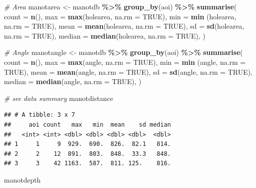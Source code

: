 \documentclass[
]{article}
\newenvironment{Shaded}{\begin{snugshade}}{\end{snugshade}}
\newcommand{\AttributeTok}[1]{\textcolor[rgb]{0.13,0.29,0.53}{#1}}
\newcommand{\CommentTok}[1]{\textcolor[rgb]{0.56,0.35,0.01}{\textit{#1}}}
\newcommand{\ConstantTok}[1]{\textcolor[rgb]{0.56,0.35,0.01}{#1}}
\newcommand{\FunctionTok}[1]{\textcolor[rgb]{0.13,0.29,0.53}{\textbf{#1}}}
\newcommand{\NormalTok}[1]{#1}
\newcommand{\OtherTok}[1]{\textcolor[rgb]{0.56,0.35,0.01}{#1}}
\newcommand{\SpecialCharTok}[1]{\textcolor[rgb]{0.81,0.36,0.00}{\textbf{#1}}}
\begin{document}
\begin{Shaded}
\begin{Highlighting}[]
\CommentTok{\# Area}
\NormalTok{manotarea }\OtherTok{\textless{}{-}}\NormalTok{ manotdb }\SpecialCharTok{\%\textgreater{}\%} \FunctionTok{group\_by}\NormalTok{(aoi) }\SpecialCharTok{\%\textgreater{}\%}
      \FunctionTok{summarise}\NormalTok{(}
      \AttributeTok{count =} \FunctionTok{n}\NormalTok{(),}
      \AttributeTok{max =} \FunctionTok{max}\NormalTok{(holearea, }\AttributeTok{na.rm =} \ConstantTok{TRUE}\NormalTok{),}
      \AttributeTok{min =} \FunctionTok{min}\NormalTok{ (holearea, }\AttributeTok{na.rm =} \ConstantTok{TRUE}\NormalTok{),}
      \AttributeTok{mean =} \FunctionTok{mean}\NormalTok{(holearea, }\AttributeTok{na.rm =} \ConstantTok{TRUE}\NormalTok{),}
      \AttributeTok{sd =} \FunctionTok{sd}\NormalTok{(holearea, }\AttributeTok{na.rm =} \ConstantTok{TRUE}\NormalTok{),}
      \AttributeTok{median =} \FunctionTok{median}\NormalTok{(holearea, }\AttributeTok{na.rm =} \ConstantTok{TRUE}\NormalTok{),}
\NormalTok{  ) }

\CommentTok{\# Angle}
\NormalTok{manotangle }\OtherTok{\textless{}{-}}\NormalTok{ manotdb }\SpecialCharTok{\%\textgreater{}\%} \FunctionTok{group\_by}\NormalTok{(aoi) }\SpecialCharTok{\%\textgreater{}\%}
      \FunctionTok{summarise}\NormalTok{(}
      \AttributeTok{count =} \FunctionTok{n}\NormalTok{(),}
      \AttributeTok{max =} \FunctionTok{max}\NormalTok{(angle, }\AttributeTok{na.rm =} \ConstantTok{TRUE}\NormalTok{),}
      \AttributeTok{min =} \FunctionTok{min}\NormalTok{ (angle, }\AttributeTok{na.rm =} \ConstantTok{TRUE}\NormalTok{),}
      \AttributeTok{mean =} \FunctionTok{mean}\NormalTok{(angle, }\AttributeTok{na.rm =} \ConstantTok{TRUE}\NormalTok{),}
      \AttributeTok{sd =} \FunctionTok{sd}\NormalTok{(angle, }\AttributeTok{na.rm =} \ConstantTok{TRUE}\NormalTok{),}
      \AttributeTok{median =} \FunctionTok{median}\NormalTok{(angle, }\AttributeTok{na.rm =} \ConstantTok{TRUE}\NormalTok{),}
\NormalTok{  ) }

\CommentTok{\# see data summary}
\NormalTok{manotdistance}
\end{Highlighting}
\end{Shaded}

\begin{verbatim}
## # A tibble: 3 x 7
##     aoi count   max   min  mean    sd median
##   <int> <int> <dbl> <dbl> <dbl> <dbl>  <dbl>
## 1     1     9  929.  690.  826.  82.1   814.
## 2     2    12  891.  803.  848.  33.3   848.
## 3     3    42 1163.  587.  811. 125.    816.
\end{verbatim}

\begin{Shaded}
\begin{Highlighting}[]
\NormalTok{manotdepth}
\end{Highlighting}
\end{Shaded}
\end{document}
